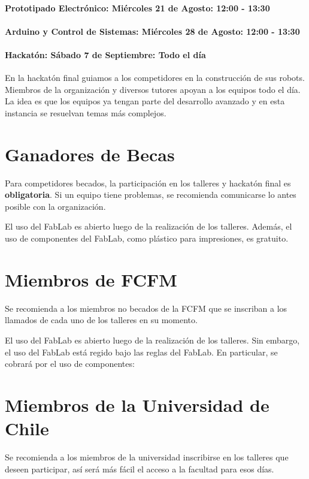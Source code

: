 \paragraph*{Prototipado Electrónico: Miércoles 21 de Agosto: 12:00 - 13:30}

\paragraph*{Arduino y Control de Sistemas: Miércoles 28 de Agosto: 12:00 - 13:30}

\paragraph*{Hackatón: Sábado 7 de Septiembre: Todo el día}
En la hackatón final guiamos a los competidores en la construcción de sus robots.
Miembros de la organización y diversos tutores apoyan a los equipos todo el día.
La idea es que los equipos ya tengan parte del desarrollo avanzado y en esta instancia se resuelvan temas más complejos.

\section{Ganadores de Becas}
Para competidores becados, la participación en los talleres y hackatón final es \textbf{obligatoria}.
Si un equipo tiene problemas, se recomienda comunicarse lo antes posible con la organización.

El uso del FabLab es abierto luego de la realización de los talleres.
Además, el uso de componentes del FabLab, como plástico para impresiones, es gratuito.

\section{Miembros de FCFM}
Se recomienda a los miembros no becados de la FCFM que se inscriban a los llamados de cada uno de los talleres en su momento.

El uso del FabLab es abierto luego de la realización de los talleres.
Sin embargo, el uso del FabLab está regido bajo las reglas del FabLab.
En particular, se cobrará por el uso de componentes:



\section{Miembros de la Universidad de Chile}
Se recomienda a los miembros de la universidad inscribirse en los talleres que deseen participar, así será más fácil el acceso a la facultad para esos días.

